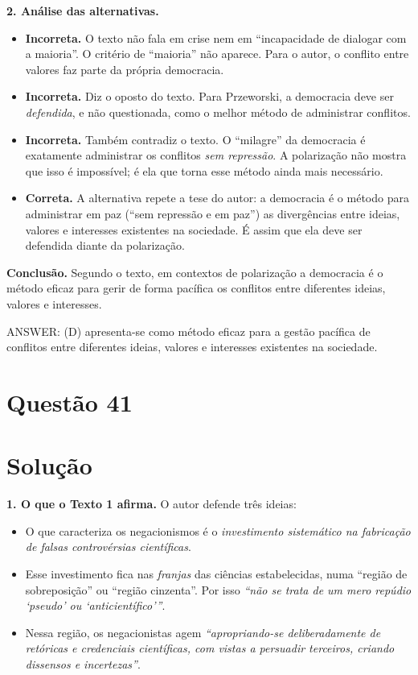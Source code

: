 \documentclass{article}%
\begin{document}
\medskip
\textbf{2. Análise das alternativas.}
\begin{itemize}
  \item[(a)] \textbf{Incorreta.} O texto não fala em crise nem em ``incapacidade de dialogar com a maioria''. O critério de ``maioria'' não aparece. Para o autor, o conflito entre valores faz parte da própria democracia.
  \item[(b)] \textbf{Incorreta.} Diz o oposto do texto. Para Przeworski, a democracia deve ser \emph{defendida}, e não questionada, como o melhor método de administrar conflitos.
  \item[(c)] \textbf{Incorreta.} Também contradiz o texto. O ``milagre'' da democracia é exatamente administrar os conflitos \emph{sem repressão}. A polarização não mostra que isso é impossível; é ela que torna esse método ainda mais necessário.
  \item[(d)] \textbf{Correta.} A alternativa repete a tese do autor: a democracia é o método para administrar em paz (``sem repressão e em paz'') as divergências entre ideias, valores e interesses existentes na sociedade. É assim que ela deve ser defendida diante da polarização.
\end{itemize}

\medskip
\textbf{Conclusão.} Segundo o texto, em contextos de polarização a democracia é o método eficaz para gerir de forma pacífica os conflitos entre diferentes ideias, valores e interesses.

\medskip
ANSWER: (D) apresenta-se como método eficaz para a gestão pacífica de conflitos entre diferentes ideias, valores e interesses existentes na sociedade.%
\newpage%
\section*{Questão 41}

\section*{Solução}

\textbf{1. O que o Texto 1 afirma.} O autor defende três ideias:
\begin{itemize}
  \item O que caracteriza os negacionismos é o \emph{investimento sistemático na fabricação de falsas controvérsias científicas}.
  \item Esse investimento fica nas \emph{franjas} das ciências estabelecidas, numa ``região de sobreposição'' ou ``região cinzenta''. Por isso \emph{``não se trata de um mero repúdio `pseudo' ou `anticientífico'''}.
  \item Nessa região, os negacionistas agem \emph{``apropriando-se deliberadamente de retóricas e credenciais científicas, com vistas a persuadir terceiros, criando dissensos e incertezas''}.
\end{itemize}
\end{document}
